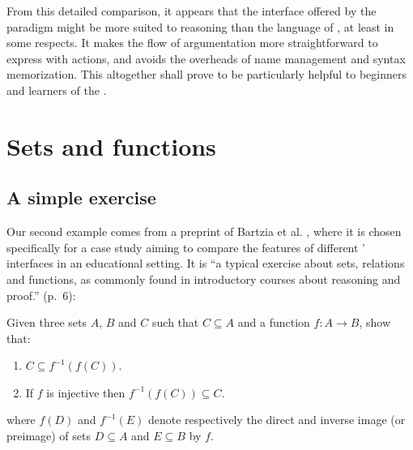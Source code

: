 From this detailed comparison, it appears that the interface offered by the
 paradigm might be more suited to  reasoning than the
 language of , at least in some respects. It makes the flow of
argumentation more straightforward to express with  actions, and avoids the
overheads of name management and syntax memorization. This altogether shall
prove to be particularly helpful to beginners and learners of the .


\section{Sets and functions}

\subsection{A simple exercise}

Our second example comes from a preprint of Bartzia et al.
, where it is chosen specifically for a case
study aiming to compare the features of different '
interfaces in an educational setting. It is ``a typical exercise about sets,
relations and functions, as commonly found in introductory courses about
reasoning and proof.'' (p.~6):

\begin{exercise}
  Given three sets $A$, $B$ and $C$ such that $C \subseteq A$ and a function $f
  : A \to B$, show that:
  \begin{enumerate}
    \item $C \subseteq f^{-1}(f(C))$.
    \item If $f$ is injective then $f^{-1}(f(C)) \subseteq C$.
  \end{enumerate}
  where $f(D)$ and $f^{-1}(E)$ denote respectively the direct and inverse image
  (or preimage) of sets $D \subseteq A$ and $E \subseteq B$ by $f$.
\end{exercise}

